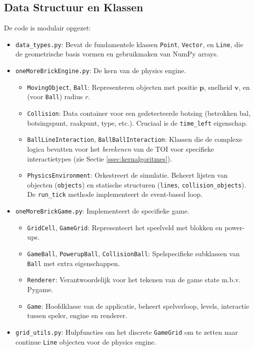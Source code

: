 \documentclass[11pt, a4paper]{article}
\newcommand{\vect}[1]{\mathbf{#1}}      %
\begin{document}
\subsection{Data Structuur en Klassen}
De code is modulair opgezet:
\begin{itemize}
    \item \texttt{data\_types.py}: Bevat de fundamentele klassen \texttt{Point}, \texttt{Vector}, en \texttt{Line}, die de geometrische basis vormen en gebruikmaken van NumPy arrays.
    \item \texttt{oneMoreBrickEngine.py}: De kern van de physics engine.
        \begin{itemize}
            \item \texttt{MovingObject}, \texttt{Ball}: Representeren objecten met positie $\vect{p}$, snelheid $\vect{v}$, en (voor \texttt{Ball}) radius $r$.
            \item \texttt{Collision}: Data container voor een gedetecteerde botsing (betrokken bal, botsingspunt, raakpunt, type, etc.). Cruciaal is de \texttt{time\_left} eigenschap.
            \item \texttt{BallLineInteraction}, \texttt{BallBallInteraction}: Klassen die de complexe logica bevatten voor het \textit{berekenen} van de TOI voor specifieke interactietypes (zie Sectie \ref{ssec:kernalgoritmes}).
            \item \texttt{PhysicsEnvironment}: Orkestreert de simulatie. Beheert lijsten van objecten (\texttt{objects}) en statische structuren (\texttt{lines}, \texttt{collision\_objects}). De \texttt{run\_tick} methode implementeert de event-based loop.
        \end{itemize}
    \item \texttt{oneMoreBrickGame.py}: Implementeert de specifieke game.
        \begin{itemize}
            \item \texttt{GridCell}, \texttt{GameGrid}: Representeert het speelveld met blokken en power-ups.
            \item \texttt{GameBall}, \texttt{PowerupBall}, \texttt{CollisionBall}: Spelspecifieke subklassen van \texttt{Ball} met extra eigenschappen.
            \item \texttt{Renderer}: Verantwoordelijk voor het tekenen van de game state m.b.v. Pygame.
            \item \texttt{Game}: Hoofdklasse van de applicatie, beheert spelverloop, levels, interactie tussen speler, engine en renderer.
        \end{itemize}
    \item \texttt{grid\_utils.py}: Hulpfuncties om het discrete \texttt{GameGrid} om te zetten naar continue \texttt{Line} objecten voor de physics engine.
\end{itemize}
\newpage
\end{document}
